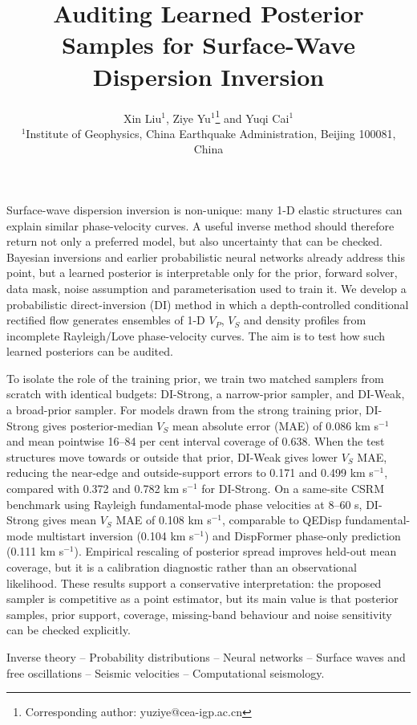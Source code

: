 \documentclass[referee]{gji}
\title[Audited probabilistic surface-wave inversion]
  {Auditing Learned Posterior Samples for Surface-Wave Dispersion Inversion}
\author[X. Liu et al.]
  {Xin Liu$^1$, Ziye Yu$^1$\thanks{Corresponding author: yuziye@cea-igp.ac.cn}
  and Yuqi Cai$^1$\\
  $^1$Institute of Geophysics, China Earthquake Administration, Beijing 100081, China
  }
\date{}
\begin{document}
\label{firstpage}
\maketitle
\linenumbers
\pagestyle{plain}

\begin{summary}
Surface-wave dispersion inversion is non-unique: many 1-D elastic structures can explain similar phase-velocity curves. A useful inverse method should therefore return not only a preferred model, but also uncertainty that can be checked. Bayesian inversions and earlier probabilistic neural networks already address this point, but a learned posterior is interpretable only for the prior, forward solver, data mask, noise assumption and parameterisation used to train it. We develop a probabilistic direct-inversion (DI) method in which a depth-controlled conditional rectified flow generates ensembles of 1-D $V_P$, $V_S$ and density profiles from incomplete Rayleigh/Love phase-velocity curves. The aim is to test how such learned posteriors can be audited.

To isolate the role of the training prior, we train two matched samplers from scratch with identical budgets: DI-Strong, a narrow-prior sampler, and DI-Weak, a broad-prior sampler. For models drawn from the strong training prior, DI-Strong gives posterior-median $V_S$ mean absolute error (MAE) of 0.086 km s$^{-1}$ and mean pointwise 16--84 per cent interval coverage of 0.638. When the test structures move towards or outside that prior, DI-Weak gives lower $V_S$ MAE, reducing the near-edge and outside-support errors to 0.171 and 0.499 km s$^{-1}$, compared with 0.372 and 0.782 km s$^{-1}$ for DI-Strong. On a same-site CSRM benchmark using Rayleigh fundamental-mode phase velocities at 8--60 s, DI-Strong gives mean $V_S$ MAE of 0.108 km s$^{-1}$, comparable to QEDisp fundamental-mode multistart inversion (0.104 km s$^{-1}$) and DispFormer phase-only prediction (0.111 km s$^{-1}$). Empirical rescaling of posterior spread improves held-out mean coverage, but it is a calibration diagnostic rather than an observational likelihood. These results support a conservative interpretation: the proposed sampler is competitive as a point estimator, but its main value is that posterior samples, prior support, coverage, missing-band behaviour and noise sensitivity can be checked explicitly.
\end{summary}

\begin{keywords}
Inverse theory -- Probability distributions -- Neural networks -- Surface waves and free oscillations -- Seismic velocities -- Computational seismology.
\end{keywords}
\end{document}
